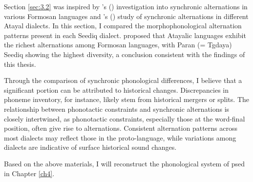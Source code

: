 Section \ref{sec:3.2} was inspired by \citeauthor{li1977morphophonemic}'s (\citeyear{li1977morphophonemic}) investigation into synchronic alternations in various Formosan languages and \citeauthor{goderich2020phd}'s (\citeyear{goderich2020phd}) study of synchronic alternations in different Atayal dialects. In this section, I compared the morphophonological alternation patterns present in each Seediq dialect. \textcite{li1977morphophonemic} proposed that Atayalic languages exhibit the richest alternations among Formosan languages, with Paran (= Tgdaya) Seediq showing the highest diversity, a conclusion consistent with the findings of this thesis.

Through the comparison of synchronic phonological differences, I believe that a significant portion can be attributed to historical changes. Discrepancies in phoneme inventory, for instance, likely stem from historical mergers or splits. The relationship between phonotactic constraints and synchronic alternations is closely intertwined, as phonotactic constraints, especially those at the word-final position, often give rise to alternations. Consistent alternation patterns across most dialects may reflect those in the proto-language, while variations among dialects are indicative of surface historical sound changes.

Based on the above materials, I will reconstruct the phonological system of \acl{psed} in Chapter \ref{ch4}.

